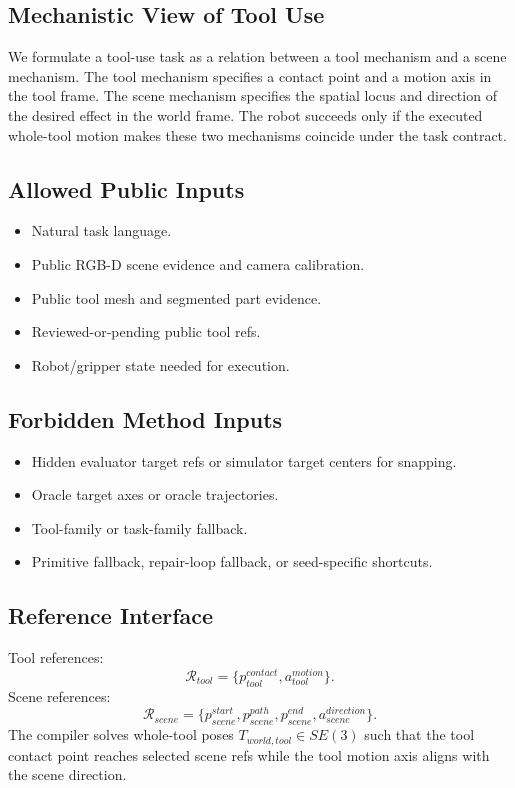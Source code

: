 \documentclass[journal]{IEEEtran}
\begin{document}
\subsection{Mechanistic View of Tool Use}
We formulate a tool-use task as a relation between a tool mechanism and a scene
mechanism. The tool mechanism specifies a contact point and a motion axis in
the tool frame. The scene mechanism specifies the spatial locus and direction
of the desired effect in the world frame. The robot succeeds only if the
executed whole-tool motion makes these two mechanisms coincide under the task
contract.

\subsection{Allowed Public Inputs}
\begin{itemize}
  \item Natural task language.
  \item Public RGB-D scene evidence and camera calibration.
  \item Public tool mesh and segmented part evidence.
  \item Reviewed-or-pending public tool refs.
  \item Robot/gripper state needed for execution.
\end{itemize}

\subsection{Forbidden Method Inputs}
\begin{itemize}
  \item Hidden evaluator target refs or simulator target centers for snapping.
  \item Oracle target axes or oracle trajectories.
  \item Tool-family or task-family fallback.
  \item Primitive fallback, repair-loop fallback, or seed-specific shortcuts.
\end{itemize}

\subsection{Reference Interface}
Tool references:
\begin{equation}
  \mathcal{R}_{tool} =
  \{p^{contact}_{tool}, a^{motion}_{tool}\}.
\end{equation}
Scene references:
\begin{equation}
  \mathcal{R}_{scene} =
  \{p^{start}_{scene}, p^{path}_{scene}, p^{end}_{scene},
  a^{direction}_{scene}\}.
\end{equation}
The compiler solves whole-tool poses $T_{world,tool}\in SE(3)$ such that the
tool contact point reaches selected scene refs while the tool motion axis
aligns with the scene direction.
\end{document}
